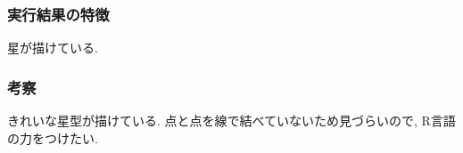 \documentclass{jsarticle}
\begin{document}
            \subsubsection{実行結果の特徴}
                星が描けている. 

            \subsubsection{考察}
                きれいな星型が描けている. 点と点を線で結べていないため見づらいので, R言語の力をつけたい. 

                
                
\end{document}
